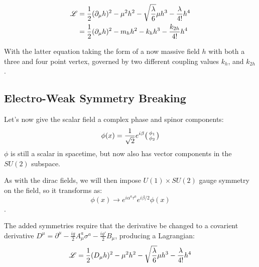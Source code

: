         \begin{equation} \begin{split} \label{eq:basic_higgs}
            \mathscr{L} & = \frac{1}{2} (\partial_{\mu} h)^2
                - \mu^2 h^2
                -\sqrt{\frac{\lambda}{6}} \mu h^3
                - \frac{\lambda}{4!} h^4 \\
             & = \frac{1}{2} (\partial_{\mu} h)^2
                - m_{h} h^2
                - k_{h} h^3
                - \frac{k_{2h}}{4!} h^4
        \end{split} \end{equation}

        With the latter equation taking the form of a now massive field $h$ with both a three and four point vertex,
            governed by two different coupling values $k_{h}$, and $k_{2h}$.

        \cite{Halzen_book}

        

    \subsection{Electro-Weak Symmetry Breaking}

        Let's now give the scalar field a complex phase and spinor components:
        \begin{equation}
            \phi(x) = \frac{1}{\sqrt{2}} e^{i \beta} \big(\begin{smallmatrix} \phi_1 \\ \phi_2 \end{smallmatrix}\big)
        \end{equation}
        $\phi$ is still a scalar in spacetime, but now also has vector components in the $SU(2)$ subspace.

        As with the dirac fields, we will then impose $U(1) \times SU(2)$ gauge symmetry on the field, so it transforms as:
        \begin{equation}
            \phi(x) \rightarrow e^{i \alpha^a \tau^a} e^{i \beta/2 } \phi(x)
        \end{equation}.

        The added symmetries require that the derivative be changed to a covarient derivative 
            $D^{\mu} = \partial^{\mu} - \frac{ig}{2} A^a_{\mu} \sigma^a - \frac{ig'}{2} B_{\mu}$,
            producing a Lagrangian:
        \begin{equation} \begin{split}
            \mathscr{L} & = \frac{1}{2} (D_{\mu} h)^2
                - \mu^2 h^2
                -\sqrt{\frac{\lambda}{6}} \mu h^3
                - \frac{\lambda}{4!} h^4 \\
        \end{split} \end{equation}

